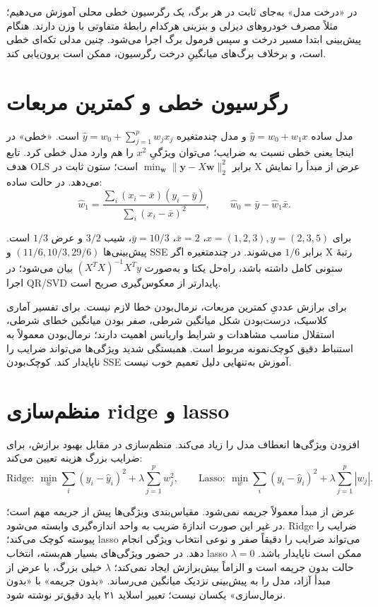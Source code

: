 در «درخت مدل» به‌جای ثابت در هر برگ، یک رگرسیون خطی محلی آموزش می‌دهیم؛ مثلاً مصرف خودروهای دیزلی و بنزینی هرکدام رابطهٔ متفاوتی با وزن دارند. هنگام پیش‌بینی ابتدا مسیر درخت و سپس فرمول برگ اجرا می‌شود. چنین مدلی تکه‌ای خطی است، و برخلاف برگ‌های میانگینِ درخت رگرسیون، ممکن است برون‌یابی کند.

\section{رگرسیون خطی و کمترین مربعات}

مدل ساده \(\widehat y=w_0+w_1x\) و مدل چندمتغیره \(\widehat y=w_0+\sum_{j=1}^p w_jx_j\) است. «خطی» در اینجا یعنی خطی نسبت به ضرایب؛ می‌توان ویژگیِ \(x^2\) را هم وارد مدل خطی کرد. تابع هدف OLS برابر \(\min_{\boldsymbol w}\|\boldsymbol y-X\boldsymbol w\|_2^2\) است؛ ستون ثابت در X عرض از مبدأ را نمایش می‌دهد. در حالت ساده: \[
\widehat w_1=\frac{\sum_i(x_i-\bar x)(y_i-\bar y)}{\sum_i(x_i-\bar x)^2},
\qquad \widehat w_0=\bar y-\widehat w_1\bar x.
\]

برای \(x=(1,2,3),y=(2,3,5)\)، \(\bar x=2\)، \(\bar y=10/3\)، شیب \(3/2\) و عرض \(1/3\) است. پیش‌بینی‌ها \((11/6,10/3,29/6)\) و SSE برابر \(1/6\) می‌شوند. در چندمتغیره اگر X رتبهٔ ستونی کامل داشته باشد، راه‌حل یکتا و به‌صورت \((X^TX)^{-1}X^Ty\) بیان می‌شود؛ در اجرا QR/SVD پایدارتر از معکوس‌گیری صریح است.

برای برازش عددیِ کمترین مربعات، نرمال‌بودن خطا لازم نیست. برای تفسیر آماری کلاسیک، درست‌بودن شکل میانگین شرطی، صفر بودن میانگین خطای شرطی، استقلال مناسب مشاهدات و شرایط واریانس اهمیت دارند؛ نرمال‌بودن معمولاً به استنباط دقیق کوچک‌نمونه مربوط است. همبستگی شدید ویژگی‌ها می‌تواند ضرایب را ناپایدار کند. کوچک‌بودن SSE آموزش به‌تنهایی دلیل تعمیم خوب نیست.

\section{منظم‌سازی ridge و lasso}

افزودن ویژگی‌ها انعطاف مدل را زیاد می‌کند. منظم‌سازی در مقابل بهبود برازش، برای ضرایب بزرگ هزینه تعیین می‌کند: \[
\text{Ridge}:\ \min_w \sum_i(y_i-\widehat y_i)^2+\lambda\sum_{j=1}^p w_j^2,
\qquad
\text{Lasso}:\ \min_w \sum_i(y_i-\widehat y_i)^2+\lambda\sum_{j=1}^p|w_j|.
\]

عرض از مبدأ معمولاً جریمه نمی‌شود. مقیاس‌بندی ویژگی‌ها پیش از جریمه مهم است؛ در غیر این صورت اندازهٔ ضریب به واحد اندازه‌گیری وابسته می‌شود. Ridge ضرایب را پیوسته کوچک می‌کند؛ lasso می‌تواند ضرایب را دقیقاً صفر و نوعی انتخاب ویژگی انجام دهد. در حضور ویژگی‌های بسیار هم‌بسته، انتخاب lasso ممکن است ناپایدار باشد. \(\lambda=0\) حالت بدون جریمه است و الزاماً بیش‌برازش ایجاد نمی‌کند؛ \(\lambda\) خیلی بزرگ، با عرض از مبدأ آزاد، مدل را به پیش‌بینی نزدیک میانگین می‌رساند. «بدون جریمه» با «بدون نرمال‌سازی» یکسان نیست؛ تعبیر اسلاید ۲۱ باید دقیق‌تر نوشته شود.

